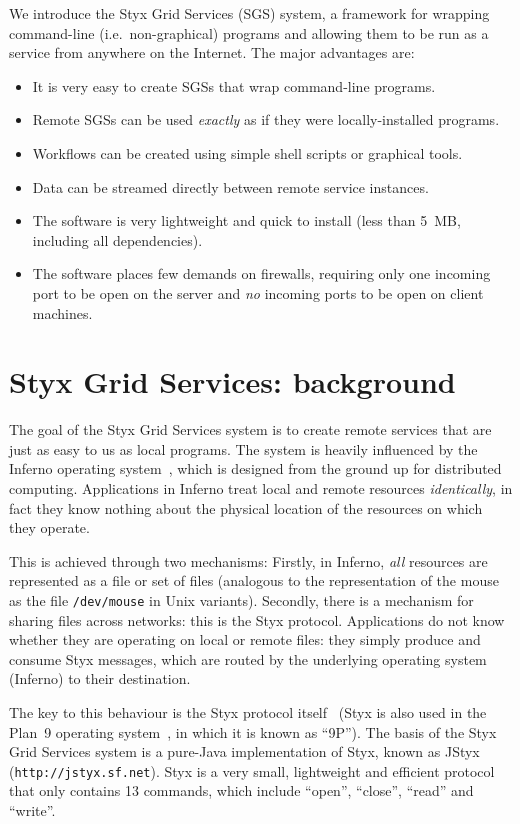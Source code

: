 \documentclass{llncs}
\begin{document}
We introduce the Styx Grid Services (SGS) system, a framework for wrapping command-line (i.e.\ non-graphical) programs and allowing them to be run as a service from anywhere on the Internet.  The major advantages are:
\begin{itemize}
  \item It is very easy to create SGSs that wrap command-line programs.
	\item Remote SGSs can be used {\em exactly\/} as if they were locally-installed programs.
	\item Workflows can be created using simple shell scripts or graphical tools.
	\item Data can be streamed directly between remote service instances.
	\item The software is very lightweight and quick to install (less than 5~MB, including all dependencies).
	\item The software places few demands on firewalls, requiring only one incoming port to be open on the server and {\em no\/} incoming ports to be open on client machines.
\end{itemize}


\section{Styx Grid Services: background}\label{sec:sgsoverview}
The goal of the Styx Grid Services system is to create remote services that are just as easy to us as local programs.  The system is heavily influenced by the Inferno operating system~\cite{Inferno}, which is designed from the ground up for distributed computing.  Applications in Inferno treat local and remote resources {\em identically\/}, in fact they know nothing about the physical location of the resources on which they operate.

This is achieved through two mechanisms: Firstly, in Inferno, {\em all\/} resources are represented as a file or set of files (analogous to the representation of the mouse as the file {\tt /dev/mouse} in Unix variants).  Secondly, there is a mechanism for sharing files across networks: this is the Styx protocol.  Applications do not know whether they are operating on local or remote files: they simply produce and consume Styx messages, which are routed by the underlying operating system (Inferno) to their destination.

The key to this behaviour is the Styx protocol itself~\cite{Pike:1999} (Styx is also used in the Plan~9 operating system~\cite{Plan9}, in which it is known as ``9P'').  The basis of the Styx Grid Services system is a pure-Java implementation of Styx, known as JStyx ({\tt http://jstyx.sf.net}).  Styx is a very small, lightweight and efficient protocol that only contains 13 commands, which include ``open'', ``close'', ``read'' and ``write''.
\end{document}
